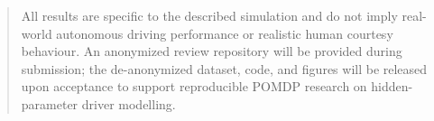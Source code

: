 \begin{abstract}
All results are specific to the described simulation and do not imply
real-world autonomous driving performance or realistic human courtesy behaviour.
An anonymized review repository will be provided during submission; the
de-anonymized dataset, code, and figures will be released upon acceptance to
support reproducible POMDP research on hidden-parameter driver modelling.
\end{abstract}
